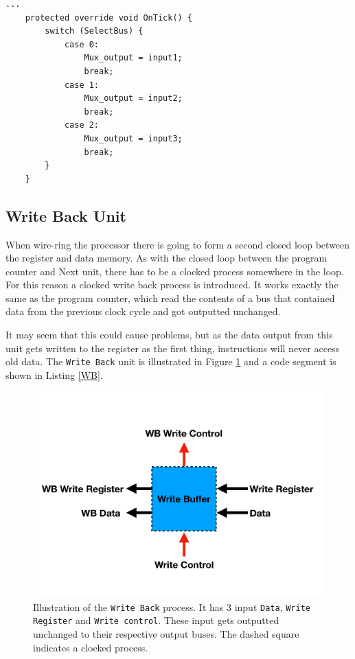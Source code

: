         \begin{minipage}{\linewidth}
            \begin{lstlisting}[language={[Sharp]C}, caption={An example of a \texttt{Multiplexer} process SME code. The whole multiplexer simply consists of a \texttt{switch} statement that selects an input to output dependent on \texttt{SelectBus}.},captionpos=b, label = MUX]
...
    protected override void OnTick() {
        switch (SelectBus) {
            case 0:
                Mux_output = input1;
                break;
            case 1:
                Mux_output = input2; 
                break;
            case 2:
                Mux_output = input3; 
                break;
        }
    }
            \end{lstlisting}
        \end{minipage}
\newpage
    \subsection{Write Back Unit}
        When wire-ring the processor there is going to form a second closed loop between the register and data memory. As with the closed loop between the program counter and Next unit, there has to be a clocked process somewhere in the loop. For this reason a clocked write back process is introduced. It works exactly the same as the program counter, which read the contents of a bus that contained data from the previous clock cycle and got outputted unchanged. 
        
        It may seem that this could cause problems, but as the data output from this unit gets written to the register as the first thing, instructions will never access old data.  The \texttt{Write Back} unit is illustrated in Figure \ref{fig:WB} and a code segment is shown in Listing \ref{WB}.
        \begin{figure}[h!]
            \centering
            \includegraphics[scale=0.35]{pictures/WB.pdf}
            \caption{Illustration of the \texttt{Write Back} process. It has 3 input \texttt{Data}, \texttt{Write Register} and \texttt{Write control}. These input gets outputted unchanged to their respective output buses. The dashed square indicates a clocked process.}
            \label{fig:WB}
        \end{figure}
    

